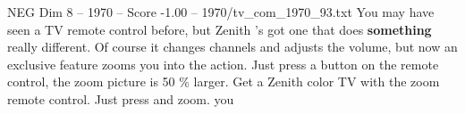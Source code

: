 \begin{textsample}{NEG Dim 8 – 1970 – Score -1.00 – 1970/tv\_com\_1970\_93.txt}  \label{ex:f8_neg_001}
You may have seen a TV remote control before, but Zenith 's got one that does \textbf{something} really different.
Of course it changes channels and adjusts the volume, but now an exclusive feature zooms you into the action.
Just press a button on the remote control, the zoom picture is 50 \% larger.
Get a Zenith color TV with the zoom remote control.
Just press and zoom. you

\end{textsample}
